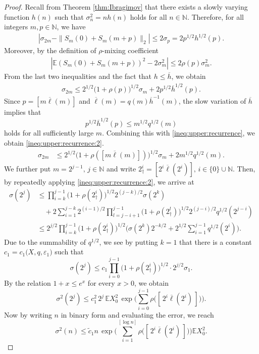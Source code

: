 \documentclass[11pt,a4,leqno]{amsart}
\newcommand{\N}{\mathbb{N}}
\newcommand{\ov}{\overline}
\newcommand{\wt}{\widetilde}
\newcommand{\vep}{\varepsilon}
\newcommand{\E }{{\mathbb E}}
\newcommand{\1}{{\mathbf 1}}
\begin{document}
\begin{proof}
 Recall from Theorem \ref{thm:Ibragimov} that there exists a slowly varying function $h(n)$ such that 
 $\sigma_n^2 =nh(n)$ holds for all $n\in\N$. 
 Therefore, for all integers $m,p\in\N$, we have 
\begin{align}
\label{ineq:sigma:rho:1}
 |\sigma_{2m}-\|S_m(0)+S_m(m+p)\|_2| \le 2\sigma_p = 2p^{1/2}h^{1/2}(p).
\end{align}
Moreover, by the definition of $\rho$-mixing coefficient 
\begin{align}
 \label{ineq:sigma:rho:2}
 |\E (S_m(0)+S_m(m+p))^2 -2 \sigma_m^2| \le 2\rho(p) \sigma_m^2. 
\end{align}
From the last two inequalities and the fact that $h\le \ov h$, 
we obtain 
\begin{align}
\label{ineq:upper:recurrence}
 \sigma_{2m} \le 2^{1/2} \big(1+\rho(p)\big)^{1/2} \sigma_m + 2p^{1/2} \ov h^{1/2}(p).
\end{align}
Since $p = [m \ov \ell(m)]$ and $\ov \ell(m) = q(m) \ov h^{-1}(m)$, the slow variation of $\ov h$ implies that
\begin{equation*}
    p^{1/2} \ov h^{1/2}(p) \le m^{1/2} q^{1/2}(m)
\end{equation*}
holds for all sufficiently large $m$. Combining this with \eqref{ineq:upper:recurrence}, we obtain \eqref{ineq:upper:recurrence:2}.
\begin{align}
 \sigma_{2m} 
& \le 2^{1/2} \big(
1+\rho([m \ov \ell (m)])
\big)^{1/2}\sigma_m + 2 m^{1/2} q^{1/2}(m). \label{ineq:upper:recurrence:2}
\end{align}
We further put $m=2^{j-1},\, j\in \N$ and write $2^i_\dag = [2^i \ov \ell (2^i)],\,i\in \{0\}\cup \N$. 
Then, by repeatedly applying \eqref{ineq:upper:recurrence:2}, we arrive at 
\begin{align*}
 \sigma(2^j) &\le \prod_{i=k}^{j-1}\big(
1+\rho(2^i_\dag)
\big)^{1/2} 2^{(j-k)/2} \sigma(2^k) \\
&\quad + 2 \sum_{i=1}^{j-k} 2^{(i-1)/2} \prod_{l=j-i+1}^{j-1} \big(1+\rho(2^l_\dag)\big)^{1/2} 2^{(j-i)/2} q^{1/2}(2^{j-i}) \\
& \le 2^{j/2} \prod_{i=k}^{j-1}\big(
1+\rho (2^i_\dag)
\big)^{1/2} \Big(\sigma(2^k)2^{-k/2}+2^{1/2} \sum_{i=1}^{j-1} q^{1/2}(2^i)\Big). 
\end{align*}
Due to the summability of $q^{1/2}$, we see by putting $k=1$ that 
there is a constant $c_1=c_1\big(X,q,\vep_1 \big)$ such that 
\[
 \sigma(2^j) \le c_1 \prod_{i=0}^{j-1}\big(
1+\rho (2^i_\dag ) 
\big)^{1/2} \cdot 2^{j/2} \sigma_1. 
\]
By the relation $1+x \le e^{x}$ for every $x>0$, we obtain
\[
 \sigma^2(2^j) \le c_1^2\, 2^j\, \E X_0^2\, \exp\bigg(
 \sum_{i=0}^{j-1} \rho \big(
[\,2^i \ov \ell (2^i)\,]
\big)
\bigg). 
\]
Now by writing $n$ in binary form and evaluating the error, we reach 
\[
 \sigma^2(n) \le \wt c_1 n\, \exp\bigg(
\sum_{i=1}^{[\log n]} \rho \big(
[\,2^i \ov \ell (2^i)\,]
\big)
\bigg) \E X_0^2. 
\]
\end{proof}
\end{document}
